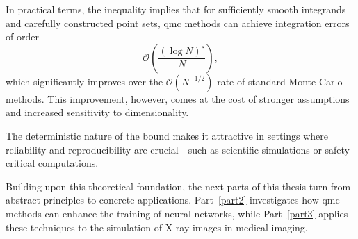 In practical terms, the inequality implies that for sufficiently smooth
integrands and carefully constructed point sets, \ac{qmc} methods can achieve
integration errors of order
\[
\mathcal{O}\left( \frac{(\log N)^s}{N} \right),
\]
which significantly improves over the $\mathcal{O}(N^{-1/2})$ rate of standard
Monte Carlo methods. This improvement, however, comes at the cost of stronger
assumptions and increased sensitivity to dimensionality.

\begin{remark}
The deterministic nature of the bound makes it attractive in settings where
reliability and reproducibility are crucial—such as scientific simulations or
safety-critical computations.
\end{remark}

\qquad

Building upon this theoretical foundation, the next parts of this thesis turn
from abstract principles to concrete applications. Part~\ref{part2} investigates
how \ac{qmc} methods can enhance the training of neural networks, while
Part~\ref{part3} applies these techniques to the simulation of X-ray images in
medical imaging.










